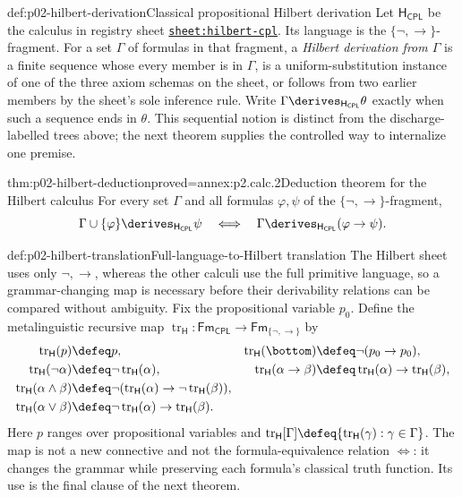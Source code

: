 \begin{hbdefinition}{def:p02-hilbert-derivation}{Classical propositional Hilbert derivation}
Let \(\mathsf H_{\mathsf{CPL}}\) be the calculus in registry sheet
\hyperref[sheet:hilbert-cpl]{\texttt{sheet:hilbert-cpl}}.  Its language is the
\(\{\neg,\to\}\)-fragment.  For a set \(\Gamma\) of formulas in that
fragment, a \emph{Hilbert derivation from \(\Gamma\)} is a finite sequence
whose every member is in \(\Gamma\), is a uniform-substitution instance of
one of the three axiom schemas on the sheet, or follows from two earlier
members by the sheet's sole inference rule.  Write
\(\Gamma\derives_{\mathsf H_{\mathsf{CPL}}}\theta\) exactly when such a
sequence ends in \(\theta\).  This sequential notion is distinct from the
discharge-labelled trees above; the next theorem supplies the controlled
way to internalize one premise.
\end{hbdefinition}

\begin{hbtheorem}{thm:p02-hilbert-deduction}{proved=annex:p2.calc.2}{Deduction theorem for the Hilbert calculus}
For every set \(\Gamma\) and all formulas \(\varphi,\psi\) of the
\(\{\neg,\to\}\)-fragment,
\[
 \Gamma\cup\{\varphi\}\derives_{\mathsf H_{\mathsf{CPL}}}\psi
 \quad\Longleftrightarrow\quad
 \Gamma\derives_{\mathsf H_{\mathsf{CPL}}}(\varphi\to\psi).
\]
\end{hbtheorem}

\begin{hbdefinition}{def:p02-hilbert-translation}{Full-language-to-Hilbert translation}
The Hilbert sheet uses only \(\neg,\to\), whereas the other calculi use the
full primitive language, so a grammar-changing map is necessary before their
derivability relations can be compared without ambiguity.  Fix the
propositional variable \(p_0\).  Define the metalinguistic recursive map
\(\operatorname{tr}_{\mathsf H}:\mathsf{Fm}_{\mathsf{CPL}}\to
\mathsf{Fm}_{\{\neg,\to\}}\) by
\[
\begin{aligned}
 \operatorname{tr}_{\mathsf H}(p)&\defeq p,
 &\operatorname{tr}_{\mathsf H}(\bottom)&\defeq\neg(p_0\to p_0),
 \\
 \operatorname{tr}_{\mathsf H}(\neg\alpha)&\defeq
   \neg\operatorname{tr}_{\mathsf H}(\alpha),
 &\operatorname{tr}_{\mathsf H}(\alpha\to\beta)&\defeq
   \operatorname{tr}_{\mathsf H}(\alpha)\to
   \operatorname{tr}_{\mathsf H}(\beta),
 \\
 \operatorname{tr}_{\mathsf H}(\alpha\land\beta)&\defeq
   \neg(\operatorname{tr}_{\mathsf H}(\alpha)\to
        \neg\operatorname{tr}_{\mathsf H}(\beta)),
 \\
 \operatorname{tr}_{\mathsf H}(\alpha\lor\beta)&\defeq
   \neg\operatorname{tr}_{\mathsf H}(\alpha)\to
        \operatorname{tr}_{\mathsf H}(\beta).
\end{aligned}
\]
Here \(p\) ranges over propositional variables and
\(\operatorname{tr}_{\mathsf H}[\Gamma]\defeq
\{\operatorname{tr}_{\mathsf H}(\gamma):\gamma\in\Gamma\}\).  The map is not a
new connective and not the formula-equivalence relation \(\Leftrightarrow\):
it changes the grammar while preserving each formula's classical truth
function.  Its use is the final clause of the next theorem.
\end{hbdefinition}


